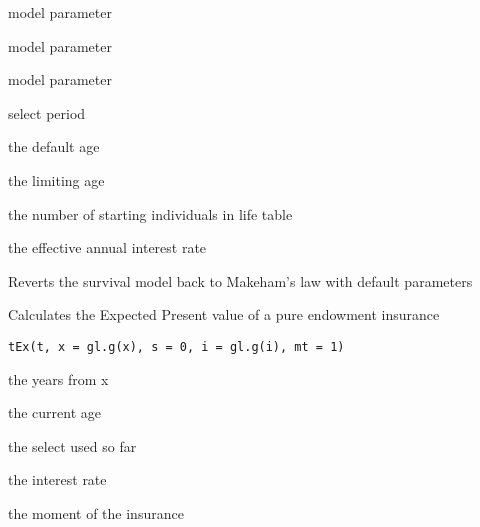 \documentclass[a4paper]{book}
\begin{document}
%
\begin{Arguments}
\begin{ldescription}
\item[\code{A}] model parameter

\item[\code{B}] model parameter

\item[\code{c}] model parameter

\item[\code{d}] select period

\item[\code{x}] the default age

\item[\code{w}] the limiting age

\item[\code{radix}] the number of starting individuals in life table

\item[\code{i}] the effective annual interest rate
\end{ldescription}
\end{Arguments}
%
\begin{Details}\relax
Reverts the survival model back to Makeham's law with default parameters
\end{Details}
%
\begin{Description}\relax
Calculates the Expected Present value of a pure endowment insurance
\end{Description}
%
\begin{Usage}
\begin{verbatim}
tEx(t, x = gl.g(x), s = 0, i = gl.g(i), mt = 1)
\end{verbatim}
\end{Usage}
%
\begin{Arguments}
\begin{ldescription}
\item[\code{t}] the years from x

\item[\code{x}] the current age

\item[\code{s}] the select used so far

\item[\code{i}] the interest rate

\item[\code{mt}] the moment of the insurance
\end{ldescription}
\end{Arguments}
\end{document}

